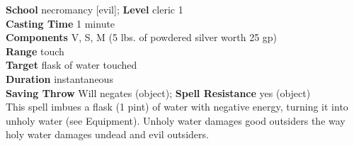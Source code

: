 \textbf{School} necromancy [evil]; \textbf{Level} cleric 1\\
\textbf{Casting Time} 1 minute\\
\textbf{Components} V, S, M (5 lbs. of powdered silver worth 25 gp)\\
\textbf{Range} touch\\
\textbf{Target} flask of water touched\\
\textbf{Duration} instantaneous\\
\textbf{Saving Throw }Will negates (object); \textbf{Spell Resistance} yes (object)\\
This spell imbues a flask (1 pint) of water with negative energy, turning it into unholy water (see Equipment). Unholy water damages good outsiders the way holy water damages undead and evil outsiders.\\
